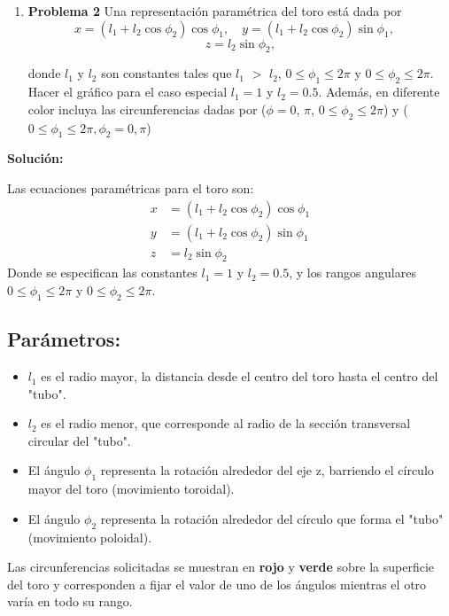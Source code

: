 \documentclass{article}
\begin{document}
\begin{enumerate}[label={{\textcolor{trueblue}{\textbf{Pr.} \arabic*.2}}}, start=2]
  \item \textbf{Problema 2} Una representación paramétrica del toro está dada por
  \[
    x=(l_1+l_2\cos\phi_2)\cos\phi_1,\quad
    y=(l_1+l_2\cos\phi_2)\sin\phi_1,\quad
  \]
  \[ z=l_2\sin\phi_2, \]
  
  
donde $l_{1}$ y $ l_{2}$ son constantes tales que $l_{1}$ $>$ $l_{2}$, $0\leq \phi_{1}\leq 2\pi$ y $0 \leq  \phi_{2}\leq 2\pi$. Hacer el gráfico para el caso especial $l_{1} =1$ y $l_{2}=0\text{.}5$. Además, en diferente color incluya las circunferencias dadas por ($\phi=0$, $\pi$, $0\leq \phi_{2}\leq 2\pi$) y ($0\leq \phi_{1}\leq 2\pi, \phi_{2}=0, \pi$) 
\end{enumerate}

\textcolor{Cinnabar}{\textbf{Soluci\'on:}}

Las ecuaciones paramétricas para el toro son:
\begin{align*}
    x &= (l_1 + l_2\cos\phi_2)\cos\phi_1 \\
    y &= (l_1 + l_2\cos\phi_2)\sin\phi_1 \\
    z &= l_2\sin\phi_2
\end{align*}
Donde se especifican las constantes $l_1=1$ y $l_2=0.5$, y los rangos angulares $0 \le \phi_1 \le 2\pi$ y $0 \le \phi_2 \le 2\pi$.

\subsection*{Parámetros:}
\begin{itemize}
    \item $l_1$ es el radio mayor, la distancia desde el centro del toro hasta el centro del "tubo".
    \item $l_2$ es el radio menor, que corresponde al radio de la sección transversal circular del "tubo".
    \item El ángulo $\phi_1$ representa la rotación alrededor del eje z, barriendo el círculo mayor del toro (movimiento toroidal).
    \item El ángulo $\phi_2$ representa la rotación alrededor del círculo que forma el "tubo" (movimiento poloidal).
\end{itemize}



Las circunferencias solicitadas se muestran en \textbf{rojo} y \textbf{verde} sobre la superficie del toro y corresponden a fijar el valor de uno de los ángulos mientras el otro varía en todo su rango.
\end{document}

